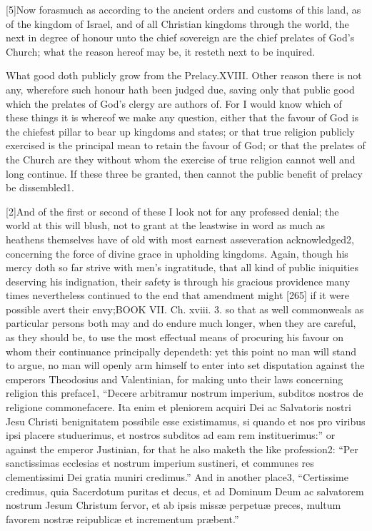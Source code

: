 [5]Now forasmuch as according to the ancient orders and customs of this land, as of the kingdom of Israel, and of all Christian kingdoms through the world, the next in degree of honour unto the chief sovereign are the chief prelates of God’s Church; what the reason hereof may be, it resteth next to be inquired.

What good doth publicly grow from the Prelacy.XVIII. Other reason there is not any, wherefore such honour hath been judged due, saving only that public good which the prelates of God’s clergy are authors of. For I would know which of these things it is whereof we make any question, either that the favour of God is the chiefest pillar to bear up kingdoms and states; or that true religion publicly exercised is the principal mean to retain the favour of God; or that the prelates of the Church are they without whom the exercise of true religion cannot well and long continue. If these three be granted, then cannot the public benefit of prelacy be dissembled1.

[2]And of the first or second of these I look not for any professed denial; the world at this will blush, not to grant at the leastwise in word as much as heathens themselves have of old with most earnest asseveration acknowledged2, concerning the force of divine grace in upholding kingdoms. Again, though his mercy doth so far strive with men’s ingratitude, that all kind of public iniquities deserving his indignation, their safety is through his gracious providence many times nevertheless continued to the end that amendment might [265] if it were possible avert their envy;BOOK VII. Ch. xviii. 3. so that as well commonweals as particular persons both may and do endure much longer, when they are careful, as they should be, to use the most effectual means of procuring his favour on whom their continuance principally dependeth: yet this point no man will stand to argue, no man will openly arm himself to enter into set disputation against the emperors Theodosius and Valentinian, for making unto their laws concerning religion this preface1, “Decere arbitramur nostrum imperium, subditos nostros de religione commonefacere. Ita enim et pleniorem acquiri Dei ac Salvatoris nostri Jesu Christi benignitatem possibile esse existimamus, si quando et nos pro viribus ipsi placere studuerimus, et nostros subditos ad eam rem instituerimus:” or against the emperor Justinian, for that he also maketh the like profession2: “Per sanctissimas ecclesias et nostrum imperium sustineri, et communes res clementissimi Dei gratia muniri credimus.” And in another place3, “Certissime credimus, quia Sacerdotum puritas et decus, et ad Dominum Deum ac salvatorem nostrum Jesum Christum fervor, et ab ipsis missæ perpetuæ preces, multum favorem nostræ reipublicæ et incrementum præbent.”

